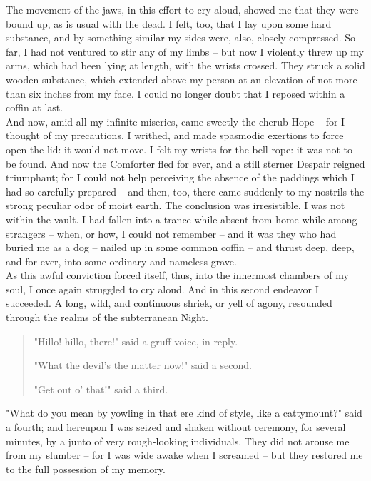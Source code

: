 \documentclass[12pt,a4paper]{article}
\begin{document}
The movement of the jaws, in this effort to cry aloud, showed me that they were bound up, as is usual with the dead. I felt, too, that I lay upon some hard substance, and by something similar my sides were, also, closely compressed. So far, I had not ventured to stir any of my limbs -- but now I violently threw up my arms, which had been lying at length, with the wrists crossed. They struck a solid wooden substance, which extended above my person at an elevation of not more than six inches from my face. I could no longer doubt that I reposed within a coffin at last. \\

And now, amid all my infinite miseries, came sweetly the cherub Hope -- for I thought of my precautions. I writhed, and made spasmodic exertions to force open the lid: it would not move. I felt my wrists for the bell-rope: it was not to be found. And now the Comforter fled for ever, and a still sterner Despair reigned triumphant; for I could not help perceiving the absence of the paddings which I had so carefully prepared -- and then, too, there came suddenly to my nostrils the strong peculiar odor of moist earth. The conclusion was irresistible. I was not within the vault. I had fallen into a trance while absent from home-while among strangers -- when, or how, I could not remember -- and it was they who had buried me as a dog -- nailed up in some common coffin -- and thrust deep, deep, and for ever, into some ordinary and nameless grave. \\

As this awful conviction forced itself, thus, into the innermost chambers of my soul, I once again struggled to cry aloud. And in this second endeavor I succeeded. A long, wild, and continuous shriek, or yell of agony, resounded through the realms of the subterranean Night. \\

\begin{quotation}
\bf

"Hillo! hillo, there!" said a gruff voice, in reply.

"What the devil's the matter now!" said a second.

"Get out o' that!" said a third.

\end{quotation}

"What do you mean by yowling in that ere kind of style, like a cattymount?" said a fourth; and hereupon I was seized and shaken without ceremony, for several minutes, by a junto of very rough-looking individuals. They did not arouse me from my slumber -- for I was wide awake when I screamed -- but they restored me to the full possession of my memory. \\
\end{document}

